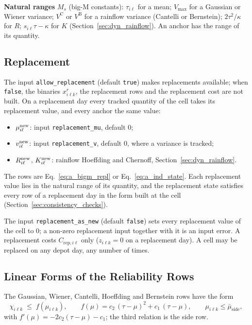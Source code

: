 \textbf{Natural ranges} $M_s$ (big-M constants): $\tau_{i\ell}$ for a mean;
$V_{\max}$ for a Gaussian or Wiener variance; $V^{\mathrm{C}}$ or $V^{\mathrm{B}}$ for
a rainflow variance (Cantelli or Bernstein); $2\tau^2/\kappa$ for $R$;
$s_{i\ell}\tau - \kappa$ for $K$ (Section~\ref{sec:dyn_rainflow}). An anchor has the
range of its quantity.

\subsection{Replacement}
\label{sec:replacement}

The input \texttt{allow\_replacement} (default \texttt{true}) makes replacements
available; when \texttt{false}, the binaries $x^r_{i\ell k}$, the replacement rows and
the replacement cost are not built. On a replacement day every tracked quantity of
the cell takes its replacement value, and every anchor the same value:
\begin{itemize}[nosep,leftmargin=1.5em]
  \item $\mu^{\mathrm{new}}_{i\ell}$: input \texttt{replacement\_mu}, default $0$;
  \item $v^{\mathrm{new}}_{i\ell}$: input \texttt{replacement\_v}, default $0$, where a
        variance is tracked;
  \item $R^{\mathrm{new}}_{i\ell}$, $K^{\mathrm{new}}_{i\ell}$: rainflow Hoeffding and Chernoff,
        Section~\ref{sec:dyn_rainflow}.
\end{itemize}
The rows are Eq.~\eqref{eq:a_bigm_repl} or Eq.~\eqref{eq:a_ind_state}. Each
replacement value lies in the natural range of its quantity, and the replacement
state satisfies every row of a replacement day in the form built at the cell
(Section~\ref{sec:consistency_checks}).

The input \texttt{replacement\_as\_new} (default \texttt{false}) sets every replacement
value of the cell to $0$; a non-zero replacement input together with it is an input
error. A replacement costs $C_{\mathrm{rep},i\ell}$ only ($z_{i\ell k} = 0$ on a
replacement day). A cell may be replaced on any depot day, any number of times.

\subsection{Linear Forms of the Reliability Rows}
\label{sec:linear_forms}

The Gaussian, Wiener, Cantelli, Hoeffding and Bernstein rows have the form
\begin{equation}
  \chi_{i\ell k} \;\leq\; f(\mu_{i\ell k}),
  \qquad f(\mu) = c_2\,(\tau - \mu)^2 + c_1\,(\tau - \mu),
  \qquad \mu_{i\ell k} \leq \bar\mu_{\mathrm{side}},
  \label{eq:a_quad}
\end{equation}
with $f'(\mu) = -2c_2(\tau - \mu) - c_1$; the third relation is the side row.

